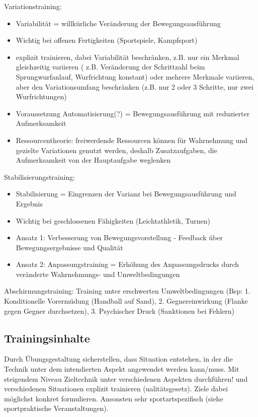 Variationstraining:
\begin{itemize}
    \item Variabilität = willkürliche Veränderung der Bewegungsausführung
    \item Wichtig bei offenen Fertigkeiten (Sportspiele, Kampfsport)
    \item explizit trainieren, dabei Variabilität beschränken, z.B. nur ein Merkmal gleichzeitig variieren ( z.B. Veränderung der Schrittzahl beim Sprungwurfanlauf, Wurfrichtung konstant) oder mehrere Merkmale variieren, aber den Variationsumfang beschränken (z.B. nur 2 oder 3 Schritte, nur zwei Wurfrichtungen)
    \item Voraussetzung Automatisierung(?) = Bewegungsausführung mit reduzierter Aufmerksamkeit
    \item Ressourcentheorie: freiwerdende Ressourcen können für Wahrnehmung und gezielte Variationen genutzt werden, deshalb Zusatzaufgaben, die Aufmerksamkeit von der Hauptaufgabe weglenken
\end{itemize}

Stabilisierungstraining:
\begin{itemize}
    \item Stabilisierung = Eingrenzen der Varianz bei Bewegungsausführung und Ergebnis
    \item Wichtig bei geschlossenen Fähigkeiten (Leichtathletik, Turnen)
    \item Ansatz 1: Verbesserung von Bewegungsvorstellung - Feedback über Bewegungsergebnisse und Qualität
    \item Ansatz 2: Anpassungstraining = Erhöhung des Anpassungsdrucks durch veränderte Wahrnehmungs- und Umweltbedingungen
\end{itemize}

Abschirmungstraining: Training unter erschwerten
Umweltbedingungen (Bsp: 1. Konditionelle Vorermüdung (Handball auf Sand), 2. Gegnereinwirkung (Flanke gegen Gegner durchsetzen), 3. Psychischer Druck (Sanktionen bei Fehlern)

\subsection{Trainingsinhalte}

Durch Übungsgestaltung sicherstellen, dass Situation entstehen, in der die Technik unter dem intendierten Aspekt angewendet werden kann/muss. Mit steigendem Niveau Zieltechnik unter verschiedenen Aspekten durchführen! und verschiedenen Situationen explizit trainieren (ualitätsgesetz).
Ziele dabei möglichst konkret formulieren.
Ansonsten sehr sportartspezifisch (siehe sportpraktische Veranstaltungen).

